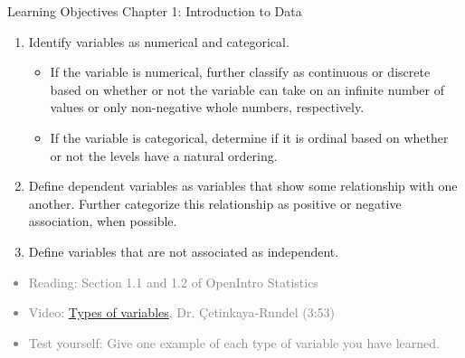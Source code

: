 \documentclass[11pt]{article}
\newcommand{\gray}[1]{\textcolor{gray}{#1}}
\begin{document}
{\LARGE \textcolor{oiB}{Learning Objectives \hfill Chapter 1: Introduction to Data}} \\

\begin{enumerate}
\renewcommand\labelenumi{\textcolor{light}{\textbf{LO \theenumi.}}}
\item Identify variables as numerical and categorical.
\begin{itemize}
\renewcommand{\labelitemi}{{\textcolor{dark}{{\tiny $\blacksquare$}}}}
\item If the variable is numerical, further classify as continuous or discrete based on whether or not the variable can take on an infinite number of values or only non-negative whole numbers, respectively.
\item If the variable is categorical, determine if it is ordinal based on whether or not the levels have a natural ordering. 
\end{itemize}

\item Define dependent variables as variables that show some relationship with one another. Further categorize this relationship as positive or negative association, when possible.

\item Define variables that are not associated as independent.

\end{enumerate}

\gray{
{\it
\vspace{-0.75cm}
\begin{itemize}
\renewcommand{\labelitemi}{{\textcolor{dark}{$\ast$}}}
\item Reading: Section 1.1 and 1.2 of OpenIntro Statistics
\item Video: \href{http://youtu.be/haug_BjhgE0}{Types of variables}, Dr. \c{C}etinkaya-Rundel (3:53)
\item Test yourself: Give one example of each type of variable you have learned. \\
\end{itemize}
}}

%

\vspace{0.5cm}

%
\end{document}
